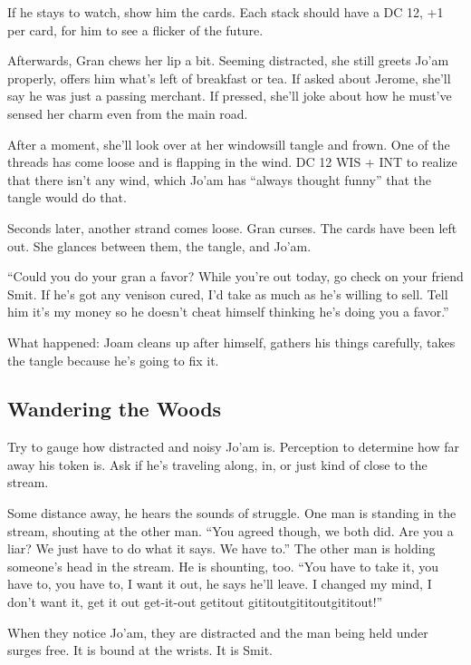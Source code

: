 \begin{multicols}{2}
If he stays to watch, show him the cards.
Each stack should have a DC 12, +1 per card, for him to see a flicker of the future.

Afterwards, Gran chews her lip a bit.
Seeming distracted, she still greets Jo'am  properly, offers him what's left of breakfast or tea.
If asked about Jerome, she'll say he was just a passing merchant.
If pressed, she'll joke about how he must've sensed her charm even from the main road.

After a moment, she'll look over at her windowsill tangle and frown.
One of the threads has come loose and is flapping in the wind.
DC 12 WIS + INT to realize that there isn't any wind, which Jo'am has ``always thought funny''
that the tangle would do that.

Seconds later, another strand comes loose.
Gran curses.
The cards have been left out.
She glances between them, the tangle, and Jo'am.

``Could you do your gran a favor?
While you're out today, go check on your friend Smit.
If he's got any venison cured, I'd take as much as he's willing to sell.
Tell him it's my money so he doesn't cheat himself thinking he's doing you a favor.''

\begin{aloud}
What happened: Joam cleans up after himself, gathers his things carefully, takes the tangle
  because he's going to fix it.
\end{aloud}

\subsection{Wandering the Woods}

Try to gauge how distracted and noisy Jo'am is.
Perception to determine how far away his token is.
Ask if he's traveling along, in, or just kind of close to the stream.

Some distance away, he hears the sounds of struggle.
One man is standing in the stream, shouting at the other man.
``You agreed though, we both did.
  Are you a liar?
  We just have to do what it says.
  We have to.''
The other man is holding someone's head in the stream.
He is shounting, too.
``You have to take it, you have to, you have to, I want it out, he says he'll leave.
I changed my mind, I don't want it, get it out get-it-out getitout gititoutgititoutgititout!''

When they notice Jo'am, they are distracted and the man being held under surges free.
It is bound at the wrists.
It is Smit.


\end{multicols}
